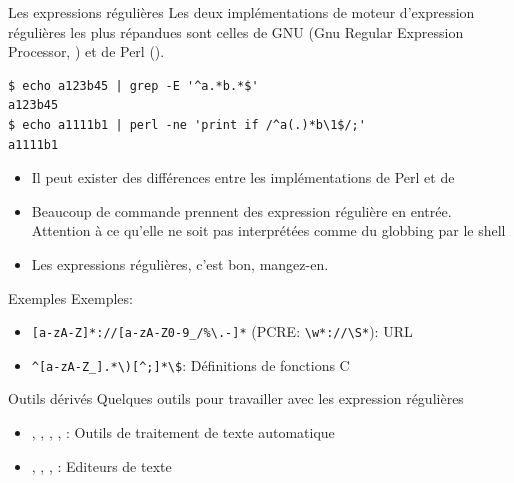 \begin{frame}[fragile=singleslide]{Les expressions régulières}
  Les deux implémentations de  moteur d'expression régulières les plus
  répandues  sont celles  de  GNU (Gnu  Regular Expression  Processor,
  ) et de Perl ().
  \begin{lstlisting}
$ echo a123b45 | grep -E '^a.*b.*$'
a123b45
$ echo a1111b1 | perl -ne 'print if /^a(.)*b\1$/;'
a1111b1
  \end{lstlisting}
  \begin{itemize}
  \item Il  peut exister des différences entre  les implémentations de
    Perl et de 
  \item  Beaucoup de  commande  prennent des  expression régulière  en
    entrée. Attention à  ce qu'elle ne soit pas  interprétées comme du
    globbing par le shell
  \item Les expressions régulières, c'est bon, mangez-en.
  \end{itemize}
\end{frame}

\begin{frame}[fragile=singleslide]{Exemples}
  Exemples:
  \begin{itemize}
  \item          \verb+[a-zA-Z]*://[a-zA-Z0-9_/%\.-]*+          (PCRE:
    \verb+\w*://\S*+): URL
  \item \verb+^[a-zA-Z_].*\)[^;]*\$+: Définitions de fonctions C
  \end{itemize}
\end{frame}

\begin{frame}[fragile=singleslide]{Outils dérivés}
  Quelques outils pour travailler avec les expression régulières
  \begin{itemize}
  \item  {}, ,  , ,  :
    Outils de traitement de texte automatique
  \item {}, , , : Editeurs de texte
  \end{itemize}
\end{frame}

